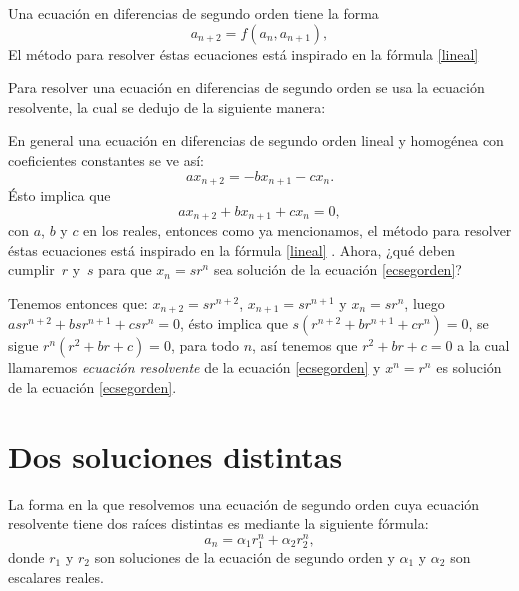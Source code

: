 \documentclass{report}
\theoremstyle{definition}
\begin{document}
Una ecuación en diferencias de segundo orden tiene la forma
\begin{equation}
                      \label{ecsegorden1}
  a_{n+2}=f(a_n,a_{n+1}),
              \end{equation}
El método para resolver éstas ecuaciones está inspirado en la fórmula \eqref{lineal} 

Para resolver una ecuación en diferencias de segundo orden se usa la
ecuación resolvente, la cual se dedujo de la siguiente manera:
        
En general una ecuación en diferencias de segundo orden lineal y homogénea con coeficientes constantes se ve así:
$$ax_{n+2}=-bx_{n+1}-cx_{n}.$$
Ésto implica que
\begin{equation}
  \label{ecsegorden}
  ax_{n+2}+bx_{n+1}+cx_{n}=0,
\end{equation}
con $a$, $b$ y $c$ en los reales, entonces como ya mencionamos, el método
para resolver éstas ecuaciones está inspirado en la fórmula \eqref{lineal}
. Ahora, ¿qué deben cumplir~$r$ y~$s$ para que $x_n=sr^n$
sea solución de la ecuación \eqref{ecsegorden}?

Tenemos entonces que: $x_{n+2}=sr^{n+2}$, $x_{n+1}=sr^{n+1}$ y
$x_{n}=sr^{n}$, luego~$asr^{n+2}+bsr^{n+1}+csr^n=0$, ésto implica que
$s(r^{n+2}+br^{n+1}+cr^n)=0$, se sigue $r^n (r^2+br+c)=0$, para todo
$n$, así tenemos que $r^2+br+c=0$ a la cual llamaremos
\textit{ecuación resolvente} de la ecuación \eqref{ecsegorden} y
$x^n=r^n$ es solución de la ecuación \eqref{ecsegorden}.



\section{Dos soluciones distintas}
\label{sec:distintas}
La forma en la que resolvemos una ecuación de segundo orden cuya
ecuación resolvente tiene dos raíces distintas es mediante la
siguiente fórmula:
\begin{equation}
 \label{raicesdistintas}
 a_n=\alpha_1r_1^n +\alpha_2r_2^n,
\end{equation}
donde $r_1$ y $r_2$ son soluciones de la ecuación de segundo orden y
$\alpha_1$ y $\alpha_2$ son escalares reales.
\end{document}
